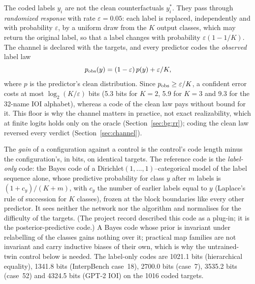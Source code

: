 \documentclass[11pt,a4paper]{article}
\begin{document}
The coded labels $y_i$ are not the clean counterfactuals $y^*_i$. They pass through \emph{randomized response} with rate $\varepsilon=0.05$: each label is replaced, independently and with probability $\varepsilon$, by a uniform draw from the $K$ output classes, which may return the original label, so that a label changes with probability $\varepsilon(1-1/K)$. The channel is declared with the targets, and every predictor codes the \emph{observed} label law
\begin{equation}
p_{\rm obs}(y)=(1-\varepsilon)\,p(y)+\varepsilon/K ,
\label{eq:channel}
\end{equation}
where $p$ is the predictor's clean distribution. Since $p_{\rm obs}\ge\varepsilon/K$, a confident error costs at most $\log_2(K/\varepsilon)$ bits (5.3 bits for $K=2$, 5.9 for $K=3$ and 9.3 for the 32-name IOI alphabet), whereas a code of the clean law pays without bound for it. This floor is why the channel matters in practice, not exact realizability, which at finite logits holds only on the oracle (Section~\ref{sec:bg:rr}); coding the clean law reversed every verdict (Section~\ref{sec:channel}).

The \emph{gain} of a configuration against a control is the control's code length minus the configuration's, in bits, on identical targets. The reference code is the \emph{label-only} code: the Bayes code of a Dirichlet$(1,\dots,1)$--categorical model of the label sequence alone, whose predictive probability for class $y$ after $m$ labels is $(1+c_y)/(K+m)$, with $c_y$ the number of earlier labels equal to $y$ (Laplace's rule of succession for $K$ classes), frozen at the block boundaries like every other predictor. It sees neither the network nor the algorithm and normalises for the difficulty of the targets. (The project record described this code as a plug-in; it is the posterior-predictive code.) A Bayes code whose prior is invariant under relabelling of the classes gains nothing over it; practical map families are not invariant and carry inductive biases of their own, which is why the untrained-twin control below is needed. The label-only codes are 1021.1 bits (hierarchical equality), 1341.8 bits (InterpBench case~18), 2700.0 bits (case~7), 3535.2 bits (case~52) and 4324.5 bits (GPT-2 IOI) on the 1016 coded targets.
\end{document}
